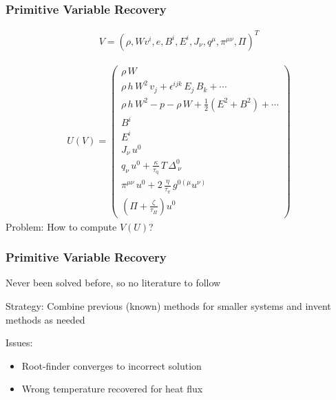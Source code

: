 \documentclass{beamer}
\begin{document}
\begin{frame}
\frametitle{Primitive Variable Recovery}

  \begin{align}
    V = \left( \rho,
          W v^{i},
          e, 
          B^{i},
          E^{i},
          J_{\nu},
          q^{\mu},
          \pi^{\mu\nu},
          \Pi
         \right)^{T}
  \end{align}

  \begin{align}
    U\left(V\right) =
      \begin{pmatrix}
        \rho \, W \\
        \rho \, h \, W^{2} \, v_{j} + \epsilon^{ijk} \, E_{j} \, B_{k} + \cdots \\
        \rho \, h \, W^{2} - p - \rho \, W + \frac{1}{2} \left( E^{2} + B^{2} \right) + \cdots \\
        B^{i} \\
        E^{i} \\
        J_{\nu} \, u^{0} \\
        q_{\nu} \, u^{0} + \frac{\kappa}{\tau_{\mathrm{q}}} \, T \, \Delta^{0}_{~\nu} \\
        \pi^{\mu\nu} \, u^{0} + 2 \, \frac{\eta}{\tau_{\pi}} \, g^{0\left(\mu\right.}u^{\left.\nu\right)} \\
        \left( \Pi + \frac{\zeta}{\tau_{\Pi}} \right) u^{0}
      \end{pmatrix}
  \end{align}
  Problem: How to compute $V\left(U\right)$?
\end{frame}

\begin{frame}
\frametitle{Primitive Variable Recovery}

  Never been solved before, so no literature to follow
  \newline

  Strategy: Combine previous (known) methods for smaller systems and
  invent methods as needed
  \newline

  Issues:
  \begin{itemize}
    \item Root-finder converges to incorrect solution
    \item Wrong temperature recovered for heat flux
  \end{itemize}

\end{frame}
\end{document}
